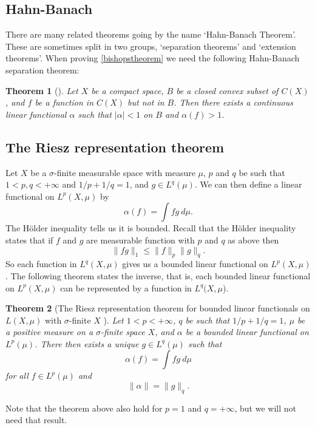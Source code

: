 \documentclass[a4paper,12pt,twoside,BCOR=10mm]{scrbook}
\newtheorem{theorem}{Theorem}[section]
\theoremstyle{definition}
\theoremstyle{definition}
\theoremstyle{definition}
\begin{document}
\subsection{Hahn-Banach}
There are many related theorems going by the name `Hahn-Banach Theorem'.
These are sometimes split in two groups, `separation theorems' and `extension theorems'.
When proving \ref{bishopstheorem} we need the following Hahn-Banach separation theorem:
\begin{theorem}[\citep{pryce}]
Let
	$X$ be a compact space,
	$B$ be a closed convex subset of $C(X)$,
	and $f$ be a function in $C(X)$ but not in $B$.
Then there exists a continuous linear functional $\alpha$ such that $|\alpha| < 1$ on $B$ and $\alpha(f) > 1$.
\end{theorem}
\subsection{The Riesz representation theorem}
Let
	$X$ be a $\sigma$-finite measurable space with measure $\mu$,
	$p$ and $q$ be such that $1 < p, q < +\infty$ and $1/p + 1/q = 1$,
	and $g \in L^q(\mu)$.
We can then define a linear functional on $L^p(X, \mu)$ by
\[
	\alpha(f) = \int fg\ d\mu.
\]
The Hölder inequality tells us it is bounded.
\label{index16}
Recall that the Hölder inequality states that if $f$ and $g$ are measurable function with $p$ and $q$ as above then
\[
	\|fg\|_1 \leq \|f\|_p\|g\|_q.
\]
So each function in $L^q(X, \mu)$ gives us a bounded linear functional on $L^p(X, \mu)$.
The following theorem states the inverse, that is, each bounded linear functional on $L^p(X, \mu)$ can be represented by a function in $L^q(X, \mu$).
\begin{theorem}[The Riesz representation theorem for bounded linear functionals on $L(X, \mu)$ with $\sigma$-finite $X$ \citep{rudin2}]
Let $1 < p < +\infty$,
	$q$ be such that $1/p + 1/q = 1$,
	$\mu$ be a positive measure on a $\sigma$-finite space $X$,
	and $\alpha$ be a bounded linear functional on $L^p(\mu)$.
There then exists a unique $g \in L^q(\mu)$ such that
\[
	\alpha(f) = \int fg\ d\mu
\]
for all $f \in L^p(\mu)$ and
\[
	\|\alpha\| = \|g\|_q.
\]
\end{theorem}
Note that the theorem above also hold for $p = 1$ and $q = +\infty$, but we will not need that result.
\end{document}
